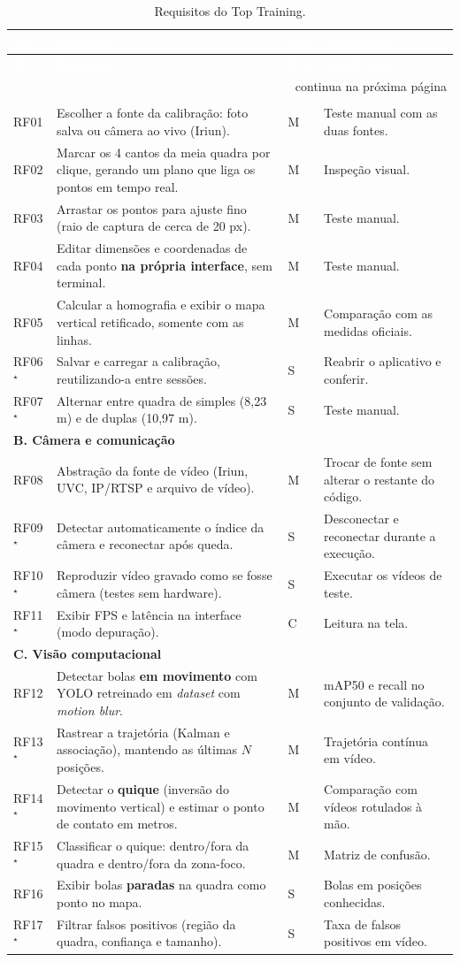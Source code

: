\documentclass[a4paper,11pt]{article}
\newcommand{\req}[4]{#1 & #2 & \centering #3 & #4 \\ \hline}
\newcommand{\reccat}[1]{\multicolumn{4}{l}{\cellcolor{blue!15}\textbf{#1}} \\ \hline}
\begin{document}
\begin{center}
\scriptsize
\renewcommand{\arraystretch}{1.3}
\begin{longtable}{|p{1.3cm}|p{7.3cm}|p{0.9cm}|p{6.0cm}|}
\caption{Requisitos do Top Training.}\label{tab:req}\\
\hline
\rowcolor{primary}\textcolor{white}{\textbf{ID}} & \textcolor{white}{\textbf{Requisito}} & \textcolor{white}{\textbf{Pri.}} & \textcolor{white}{\textbf{Verificação}} \\ \hline
\endfirsthead
\hline
\rowcolor{primary}\textcolor{white}{\textbf{ID}} & \textcolor{white}{\textbf{Requisito}} & \textcolor{white}{\textbf{Pri.}} & \textcolor{white}{\textbf{Verificação}} \\ \hline
\endhead
\hline \multicolumn{4}{r}{\tiny continua na próxima página} \\
\endfoot
\hline
\endlastfoot

\reccat{A. Mapeamento da quadra (formato e layout da interface)}
\req{RF01}{Escolher a fonte da calibração: foto salva ou câmera ao vivo (Iriun).}{M}{Teste manual com as duas fontes.}
\req{RF02}{Marcar os 4 cantos da meia quadra por clique, gerando um plano que liga os pontos em tempo real.}{M}{Inspeção visual.}
\req{RF03}{Arrastar os pontos para ajuste fino (raio de captura de cerca de 20 px).}{M}{Teste manual.}
\req{RF04}{Editar dimensões e coordenadas de cada ponto \textbf{na própria interface}, sem terminal.}{M}{Teste manual.}
\req{RF05}{Calcular a homografia e exibir o mapa vertical retificado, somente com as linhas.}{M}{Comparação com as medidas oficiais.}
\req{RF06$^{\star}$}{Salvar e carregar a calibração, reutilizando-a entre sessões.}{S}{Reabrir o aplicativo e conferir.}
\req{RF07$^{\star}$}{Alternar entre quadra de simples (8,23 m) e de duplas (10,97 m).}{S}{Teste manual.}

\reccat{B. Câmera e comunicação}
\req{RF08}{Abstração da fonte de vídeo (Iriun, UVC, IP/RTSP e arquivo de vídeo).}{M}{Trocar de fonte sem alterar o restante do código.}
\req{RF09$^{\star}$}{Detectar automaticamente o índice da câmera e reconectar após queda.}{S}{Desconectar e reconectar durante a execução.}
\req{RF10$^{\star}$}{Reproduzir vídeo gravado como se fosse câmera (testes sem hardware).}{S}{Executar os vídeos de teste.}
\req{RF11$^{\star}$}{Exibir FPS e latência na interface (modo depuração).}{C}{Leitura na tela.}

\reccat{C. Visão computacional}
\req{RF12}{Detectar bolas \textbf{em movimento} com YOLO retreinado em \textit{dataset} com \textit{motion blur}.}{M}{mAP50 e recall no conjunto de validação.}
\req{RF13$^{\star}$}{Rastrear a trajetória (Kalman e associação), mantendo as últimas $N$ posições.}{M}{Trajetória contínua em vídeo.}
\req{RF14$^{\star}$}{Detectar o \textbf{quique} (inversão do movimento vertical) e estimar o ponto de contato em metros.}{M}{Comparação com vídeos rotulados à mão.}
\req{RF15$^{\star}$}{Classificar o quique: dentro/fora da quadra e dentro/fora da zona-foco.}{M}{Matriz de confusão.}
\req{RF16}{Exibir bolas \textbf{paradas} na quadra como ponto no mapa.}{S}{Bolas em posições conhecidas.}
\req{RF17$^{\star}$}{Filtrar falsos positivos (região da quadra, confiança e tamanho).}{S}{Taxa de falsos positivos em vídeo.}


\end{longtable}
\end{center}
\end{document}
